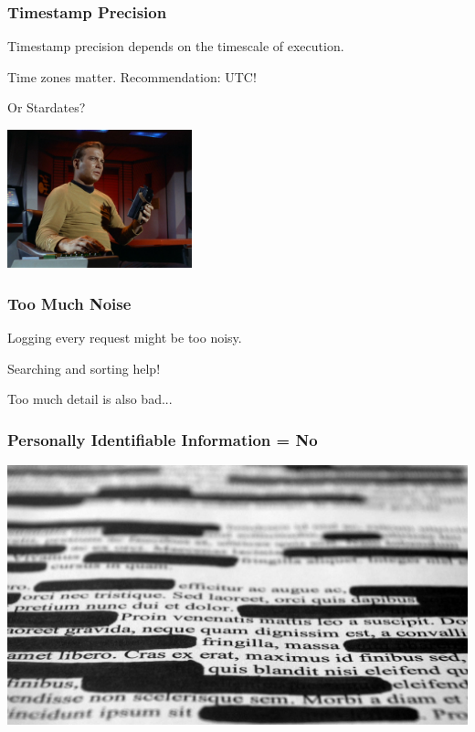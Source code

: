 \begin{frame}
\frametitle{Timestamp Precision}

Timestamp precision depends on the timescale of execution.

Time zones matter. Recommendation: UTC!

Or Stardates?

\begin{center}
	\includegraphics[width=0.4\textwidth]{images/captainslog.jpg}
\end{center}

\end{frame}


\begin{frame}
\frametitle{Too Much Noise}

Logging every request might be too noisy.

Searching and sorting help!

Too much detail is also bad...

\end{frame}


\begin{frame}
\frametitle{Personally Identifiable Information = No}

\begin{center}
	\includegraphics[width=\textwidth]{images/redacted.jpg}
\end{center}

\end{frame}


